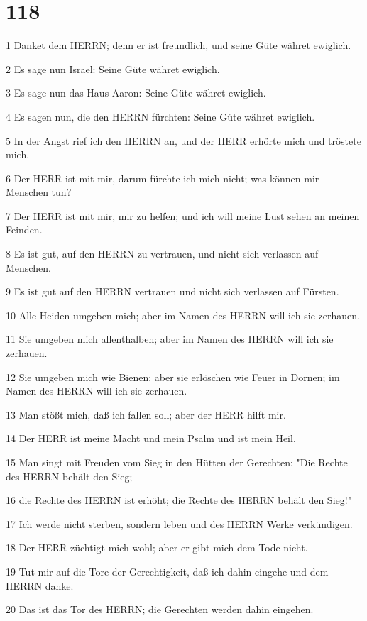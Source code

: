 \chapter{118}

\par 1 Danket dem HERRN; denn er ist freundlich, und seine Güte währet ewiglich.
\par 2 Es sage nun Israel: Seine Güte währet ewiglich.
\par 3 Es sage nun das Haus Aaron: Seine Güte währet ewiglich.
\par 4 Es sagen nun, die den HERRN fürchten: Seine Güte währet ewiglich.
\par 5 In der Angst rief ich den HERRN an, und der HERR erhörte mich und tröstete mich.
\par 6 Der HERR ist mit mir, darum fürchte ich mich nicht; was können mir Menschen tun?
\par 7 Der HERR ist mit mir, mir zu helfen; und ich will meine Lust sehen an meinen Feinden.
\par 8 Es ist gut, auf den HERRN zu vertrauen, und nicht sich verlassen auf Menschen.
\par 9 Es ist gut auf den HERRN vertrauen und nicht sich verlassen auf Fürsten.
\par 10 Alle Heiden umgeben mich; aber im Namen des HERRN will ich sie zerhauen.
\par 11 Sie umgeben mich allenthalben; aber im Namen des HERRN will ich sie zerhauen.
\par 12 Sie umgeben mich wie Bienen; aber sie erlöschen wie Feuer in Dornen; im Namen des HERRN will ich sie zerhauen.
\par 13 Man stößt mich, daß ich fallen soll; aber der HERR hilft mir.
\par 14 Der HERR ist meine Macht und mein Psalm und ist mein Heil.
\par 15 Man singt mit Freuden vom Sieg in den Hütten der Gerechten: "Die Rechte des HERRN behält den Sieg;
\par 16 die Rechte des HERRN ist erhöht; die Rechte des HERRN behält den Sieg!"
\par 17 Ich werde nicht sterben, sondern leben und des HERRN Werke verkündigen.
\par 18 Der HERR züchtigt mich wohl; aber er gibt mich dem Tode nicht.
\par 19 Tut mir auf die Tore der Gerechtigkeit, daß ich dahin eingehe und dem HERRN danke.
\par 20 Das ist das Tor des HERRN; die Gerechten werden dahin eingehen.
